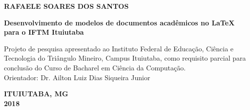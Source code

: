 \newpage
\thispagestyle{empty}

\begin{center}
\textbf{RAFAELE SOARES DOS SANTOS}

\vspace*{3 cm}

\textbf{Desenvolvimento de modelos de documentos acadêmicos no LaTeX para o IFTM Ituiutaba}
\end{center}

\vspace*{3 cm}

\hfill
\begin{minipage}{8cm}
Projeto de pesquisa apresentado ao Instituto Federal de Educação, Ciência e Tecnologia do Triângulo Mineiro, Campus Ituiutaba, como requisito parcial para conclusão do Curso de Bacharel em Ciência da Computação.\\

Orientador: Dr. Ailton Luiz Dias Siqueira Junior\\
\end{minipage}

\vspace*{8.5 cm}

\begin{center}
\textbf{ITUIUTABA, MG\\2018}
\end{center}